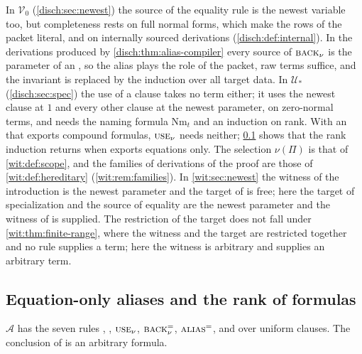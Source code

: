 \begin{remark}
\label{disch:rem:alias-relations}
In $\mathcal V_0$ (\cref{disch:sec:newest}) the source of the equality rule
is the newest variable too, but completeness rests on full normal forms,
which make the rows of the packet literal, and on internally sourced
derivations (\cref{disch:def:internal}). In the derivations produced by
\cref{disch:thm:alias-compiler} every source of $\rulename{Back}_{\nu}$ is
the parameter of an , so the alias plays the role of the
packet, raw terms suffice, and the invariant is replaced by the induction
over all target data. In $\mathcal U_*$ (\cref{disch:sec:spec}) the use of
a clause takes no term either; it uses the newest clause at $1$ and every
other clause at the newest parameter, on zero-normal terms, and needs the
naming formula $\mathrm{Nm}_t$ and an induction on rank. With an
 that exports compound formulas, $\rulename{Use}_{\nu}$
needs neither; \cref{disch:sec:alias-atomic} shows that the rank induction
returns when  exports equations only. The selection
$\nu(\Pi)$ is that of \cref{wit:def:scope}, and the families of
derivations of the proof are those of \cref{wit:def:hereditary}
(\cref{wit:rem:families}). In \cref{wit:sec:newest} the witness of the
introduction is the newest parameter and the target of  is
free; here the target of specialization and the source of equality are the
newest parameter and the witness of  is supplied. The
restriction of the target does not fall under
\cref{wit:thm:finite-range}, where the witness and the target are
restricted together and no rule supplies a term; here the witness is
arbitrary and  supplies an arbitrary term.
\end{remark}

\subsection{Equation-only aliases and the rank of formulas}
\label{disch:sec:alias-atomic}

\begin{definition}
\label{disch:def:alias-atomic}
$\mathcal A$ has the seven rules , ,
$\rulename{Use}_{\nu}$, $\rulename{Back}^{=}_{\nu}$,
$\rulename{Alias}^{=}$,  and  over uniform
clauses. The conclusion of  is an arbitrary formula.
\end{definition}

